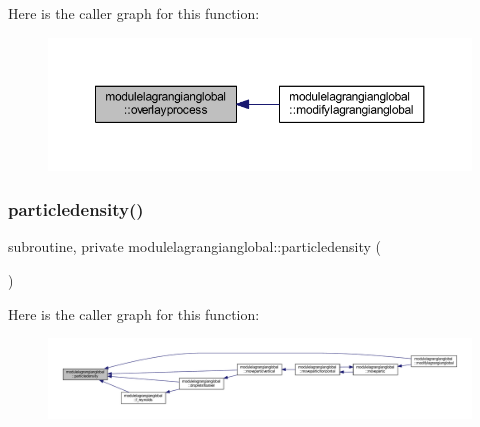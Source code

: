 Here is the caller graph for this function\+:\nopagebreak
\begin{figure}[H]
\begin{center}
\leavevmode
\includegraphics[width=350pt]{namespacemodulelagrangianglobal_ac6d604733d4fe67d94733e7f0e9d8a12_icgraph}
\end{center}
\end{figure}
\mbox{\label{namespacemodulelagrangianglobal_ab8679a80515beaf8591834517dac26d2}} 
\subsubsection{\texorpdfstring{particledensity()}{particledensity()}}
{\footnotesize\ttfamily subroutine, private modulelagrangianglobal\+::particledensity (\begin{DoxyParamCaption}{ }\end{DoxyParamCaption})\hspace{0.3cm}{\ttfamily [private]}}

Here is the caller graph for this function\+:\nopagebreak
\begin{figure}[H]
\begin{center}
\leavevmode
\includegraphics[width=350pt]{namespacemodulelagrangianglobal_ab8679a80515beaf8591834517dac26d2_icgraph}
\end{center}
\end{figure}
\mbox{\label{namespacemodulelagrangianglobal_ab8435882bf5630b41c65435698454d30}} 
